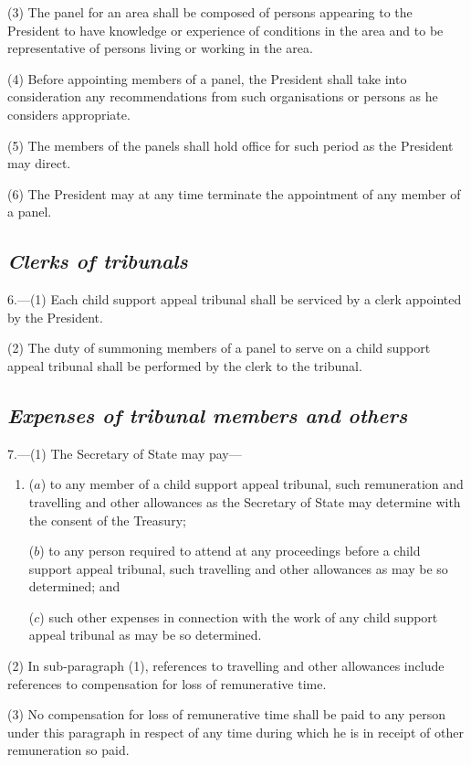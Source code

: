 \documentclass[12pt,a4paper]{article}
\begin{document}
(3) The panel for an area shall be composed of persons appearing to the President to have knowledge or experience of conditions in the area and to be representative of persons living or working in the area.

(4) Before appointing members of a panel, the President shall take into consideration any recommendations from such organisations or persons as he considers appropriate.

(5) The members of the panels shall hold office for such period as the President may direct.

(6) The President may at any time terminate the appointment of any member of a panel.

\subsection*{\itshape Clerks of tribunals}

6.---(1) Each child support appeal tribunal shall be serviced by a clerk appointed by the President.

(2) The duty of summoning members of a panel to serve on a child support appeal tribunal shall be performed by the clerk to the tribunal.

\subsection*{\itshape Expenses of tribunal members and others}

7.---(1) The Secretary of State may pay—
\begin{enumerate}\item[]
($a$) to any member of a child support appeal tribunal, such remuneration and travelling and other allowances as the Secretary of State may determine with the consent of the Treasury;

($b$) to any person required to attend at any proceedings before a child support appeal tribunal, such travelling and other allowances as may be so determined; and

($c$) such other expenses in connection with the work of any child support appeal tribunal as may be so determined.
\end{enumerate}

(2) In sub-paragraph (1), references to travelling and other allowances include references to compensation for loss of remunerative time.

(3) No compensation for loss of remunerative time shall be paid to any person under this paragraph in respect of any time during which he is in receipt of other remuneration so paid.
\end{document}
